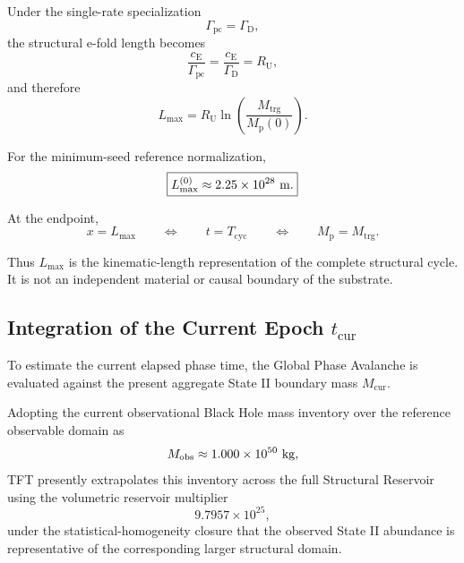 Under the single-rate specialization
\begin{equation}
    \Gamma_{\mathrm{pc}}
    =
    \Gamma_{\mathrm D},
\end{equation}
the structural e-fold length becomes
\begin{equation}
    \frac{
        c_{\mathrm E}
    }{
        \Gamma_{\mathrm{pc}}
    }
    =
    \frac{
        c_{\mathrm E}
    }{
        \Gamma_{\mathrm D}
    }
    =
    R_{\mathrm U},
\end{equation}
and therefore
\begin{equation}
    L_{\mathrm{max}}
    =
    R_{\mathrm U}
    \ln
    \left(
        \frac{
            M_{\mathrm{trg}}
        }{
            M_{\mathrm p}(0)
        }
    \right).
\end{equation}

For the minimum-seed reference normalization,
\begin{equation}
    \boxed{
    L_{\mathrm{max}}^{(0)}
    \approx
    2.25\times10^{28}
    \ {\rm m}.
    }
\end{equation}

At the endpoint,
\begin{equation}
    x
    =
    L_{\mathrm{max}}
    \qquad\Longleftrightarrow\qquad
    t
    =
    T_{\mathrm{cyc}}
    \qquad\Longleftrightarrow\qquad
    M_{\mathrm p}
    =
    M_{\mathrm{trg}}.
\end{equation}

Thus \(L_{\mathrm{max}}\) is the kinematic-length representation of the
complete structural cycle. It is not an independent material or causal
boundary of the substrate.


\subsection{Integration of the Current Epoch
\texorpdfstring{$t_{\mathrm{cur}}$}{tcur}}

To estimate the current elapsed phase time, the Global Phase Avalanche is
evaluated against the present aggregate State II boundary mass
\(M_{\mathrm{cur}}\).

Adopting the current observational Black Hole mass inventory over the
reference observable domain as
\begin{equation}
    M_{\mathrm{obs}}
    \approx
    1.000\times10^{50}
    \ {\rm kg},
\end{equation}
TFT presently extrapolates this inventory across the full Structural Reservoir
using the volumetric reservoir multiplier
\begin{equation}
    9.7957\times10^{25},
\end{equation}
under the statistical-homogeneity closure that the observed State II
abundance is representative of the corresponding larger structural domain.

